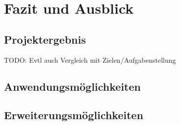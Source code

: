 \chapter{Fazit und Ausblick}
\section{Projektergebnis}
TODO: Evtl auch Vergleich mit Zielen/Aufgabenstellung
\section{Anwendungsmöglichkeiten}
\section{Erweiterungsmöglichkeiten}
